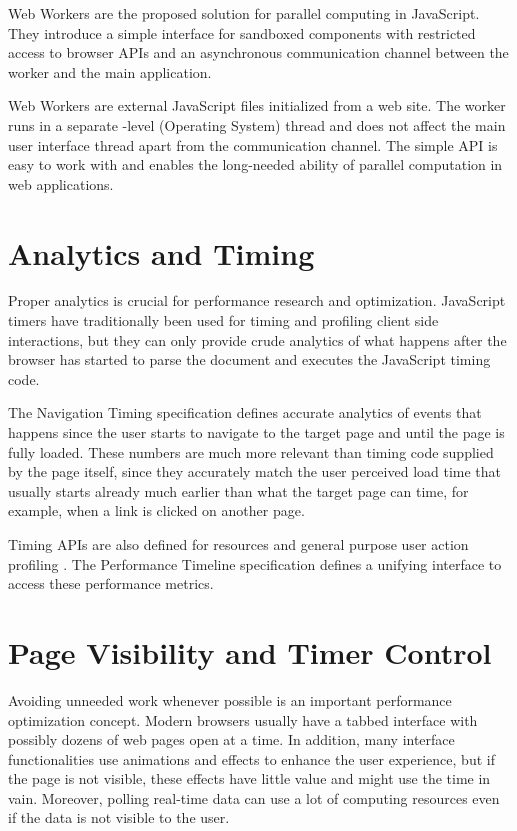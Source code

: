 Web Workers are the proposed solution for parallel computing in
JavaScript. They introduce a simple interface for sandboxed components
with restricted access to browser APIs and an asynchronous
communication channel between the worker and the main
application. \cite{WebWorkers}

Web Workers are external JavaScript files initialized from a web
site. The worker runs in a separate -level (Operating System)
thread and does not affect the main user interface thread apart from
the communication channel. The simple API is easy to work with and
enables the long-needed ability of parallel computation in web
applications.

\section{Analytics and Timing}

Proper analytics is crucial for performance research and
optimization. JavaScript timers have traditionally been used for
timing and profiling client side interactions, but they can only
provide crude analytics of what happens after the browser has started
to parse the document and executes the JavaScript timing code.

The Navigation Timing specification \cite{NavigationTiming} defines
accurate analytics of events that happens since the user starts to
navigate to the target page and until the page is fully loaded. These
numbers are much more relevant than timing code supplied by the page
itself, since they accurately match the user perceived load time that
usually starts already much earlier than what the target page can
time, for example, when a link is clicked on another page.

Timing APIs are also defined for resources \cite{ResourceTiming} and
general purpose user action profiling \cite{UserTiming}. The
Performance Timeline specification \cite{PerformanceTimeline} defines
a unifying interface to access these performance metrics.

\section{Page Visibility and Timer Control}

Avoiding unneeded work whenever possible is an important performance
optimization concept. Modern browsers usually have a tabbed interface
with possibly dozens of web pages open at a time. In addition, many
interface functionalities use animations and effects to enhance the
user experience, but if the page is not visible, these effects have
little value and might use the  time in vain. Moreover,
polling real-time data can use a lot of computing resources even if
the data is not visible to the user.

